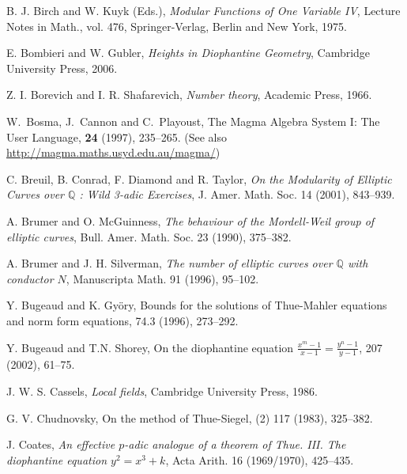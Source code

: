 \begin{thebibliography}{}
B. J. Birch and W. Kuyk (Eds.),
\emph{Modular Functions of One Variable IV},
Lecture Notes in Math., vol. 476, Springer-Verlag, Berlin and New York, 1975.

E. Bombieri and W. Gubler,
\emph{Heights in Diophantine Geometry}, 
Cambridge University Press, 2006.

Z. I. Borevich and I. R. Shafarevich, \emph{Number theory},
Academic Press, 1966.

W.\ Bosma, J.\ Cannon and C.\ Playoust,
\newblock The Magma Algebra System I: The User Language,
 {\bf 24} (1997), 235--265. (See also \url{http://magma.maths.usyd.edu.au/magma/})

C. Breuil, B. Conrad, F. Diamond and R. Taylor,
\emph{On the Modularity of Elliptic Curves over $\mathbb{Q}$ : Wild 3-adic Exercises},
J. Amer. Math. Soc. 14 (2001), 843--939.

A. Brumer and O. McGuinness,
\emph{The behaviour of the Mordell-Weil group of elliptic curves},
Bull. Amer. Math. Soc. 23 (1990), 375--382.

A. Brumer and J. H. Silverman,
\emph{The number of elliptic curves over $\mathbb{Q}$ with conductor $N$},
Manuscripta Math. 91 (1996), 95--102.

Y. Bugeaud and K. Gy\"{o}ry, 
\newblock Bounds for the solutions of Thue-Mahler equations and norm form equations, 
 74.3 (1996), 273--292.

Y. Bugeaud and T.N. Shorey,
\newblock On the diophantine equation $\frac{x^m-1}{x-1} = \frac{y^n-1}{y-1}$,
  207 (2002), 61--75.

J. W. S. Cassels, \emph{Local fields},
Cambridge University Press, 1986.

G. V. Chudnovsky, 
\newblock On the method of Thue-Siegel, 
 (2) 117 (1983), 325--382. 

J. Coates,
\emph{An effective $p$-adic analogue of a theorem of Thue. III. The diophantine equation $y^2=x^3+k$},
Acta Arith. 16 (1969/1970), 425--435.



\end{thebibliography}
